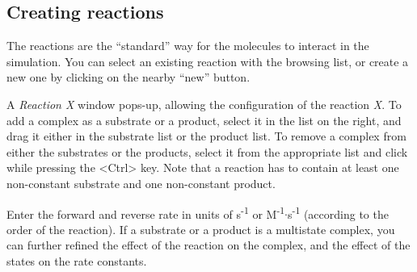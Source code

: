 \subsection{Creating reactions}\label{reactions}
The reactions are the ``standard'' way for the molecules to interact in the
simulation.  You can select an existing reaction with the browsing list, or
create a new one by clicking on the nearby ``new'' button.

 A \emph{Reaction X} window
pops-up, allowing the configuration of the reaction \emph{X}. To add a complex as a
substrate or a product, select it in the list on the right, and drag it either in
the substrate list or the product list.  To remove a complex from either the
substrates or the products, select it from the appropriate list and click while
pressing the <Ctrl> key. Note that a reaction has to contain at least one
non-constant substrate and one non-constant product.

Enter the forward and reverse rate in units of s\textsuperscript{-1} or
M\textsuperscript{-1}$\cdot$s\textsuperscript{-1} (according to the order of the
reaction). If a substrate or a product is a multistate complex, you can further
refined the effect of the reaction on the complex, and the effect of the states
on the rate constants.

\vspace{2.5\baselineskip}

